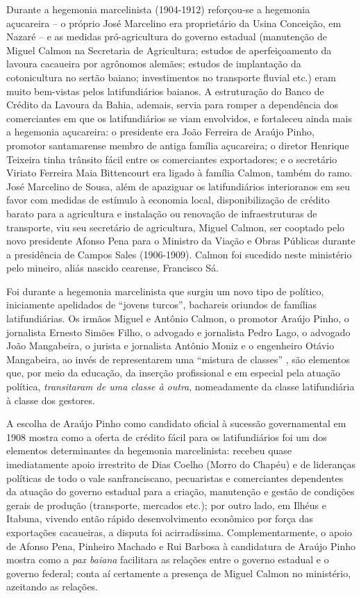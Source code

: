 Durante a hegemonia marcelinista (1904-1912) reforçou-se a hegemonia açucareira -- o próprio José Marcelino era proprietário da Usina Conceição, em Nazaré -- e as medidas pró-agricultura do governo estadual (manutenção de Miguel Calmon na Secretaria de Agricultura; estudos de aperfeiçoamento da lavoura cacaueira por agrônomos alemães; estudos de implantação da cotonicultura no sertão baiano; investimentos no transporte fluvial etc.) eram muito bem-vistas pelos latifundiários baianos. A estruturação do Banco de Crédito da Lavoura da Bahia, ademais, servia para romper a dependência dos comerciantes em que os latifundiários se viam envolvidos, e fortaleceu ainda mais a hegemonia açucareira: o presidente era João Ferreira de Araújo Pinho, promotor santamarense membro de antiga família açucareira; o diretor Henrique Teixeira tinha trânsito fácil entre os comerciantes exportadores; e o secretário Viriato Ferreira Maia Bittencourt era ligado à família Calmon, também do ramo. José Marcelino de Sousa, além de apaziguar os latifundiários interioranos em seu favor com medidas de estímulo à economia local, disponibilização de crédito barato para a agricultura e instalação ou renovação de infraestruturas de transporte, viu seu secretário de agricultura, Miguel Calmon, ser cooptado pelo novo presidente Afonso Pena para o Ministro da Viação e Obras Públicas durante a presidência de Campos Sales (1906-1909). Calmon foi sucedido neste ministério pelo mineiro, aliás nascido cearense, Francisco Sá.

Foi durante a hegemonia marcelinista que surgiu um novo tipo de político, iniciamente apelidados de ``jovens turcos'', bachareis oriundos de famílias latifundiárias. Os irmãos Miguel e Antônio Calmon, o promotor Araújo Pinho, o jornalista Ernesto Simões Filho, o advogado e jornalista Pedro Lago, o advogado João Mangabeira, o jurista e jornalista Antônio Moniz e o engenheiro Otávio Mangabeira, ao invés de representarem uma ``mistura de classes'' \cite[p.~93]{pang_coronelismo_1979}, são elementos que, por meio da educação, da inserção profissional e em especial pela atuação política, \textit{transitaram de uma classe à outra}, nomeadamente da classe latifundiária à classe dos gestores.

A escolha de Araújo Pinho como candidato oficial à sucessão governamental em 1908 mostra como a oferta de crédito fácil para os latifundiários foi um dos elementos determinantes da hegemonia marcelinista: recebeu quase imediatamente apoio irrestrito de Dias Coelho (Morro do Chapéu) e de lideranças políticas de todo o vale sanfranciscano, pecuaristas e comerciantes dependentes da atuação do governo estadual para a criação, manutenção e gestão de condições gerais de produção (transporte, mercados etc.); por outro lado, em Ilhéus e Itabuna, vivendo então rápido desenvolvimento econômico por força das exportações cacaueiras, a disputa foi acirradíssima. Complementarmente, o apoio de Afonso Pena, Pinheiro Machado e Rui Barbosa à candidatura de Araújo Pinho mostra como a \textit{pax baiana} facilitara as relações entre o governo estadual e o governo federal; conta aí certamente a presença de Miguel Calmon no ministério, azeitando as relações.

